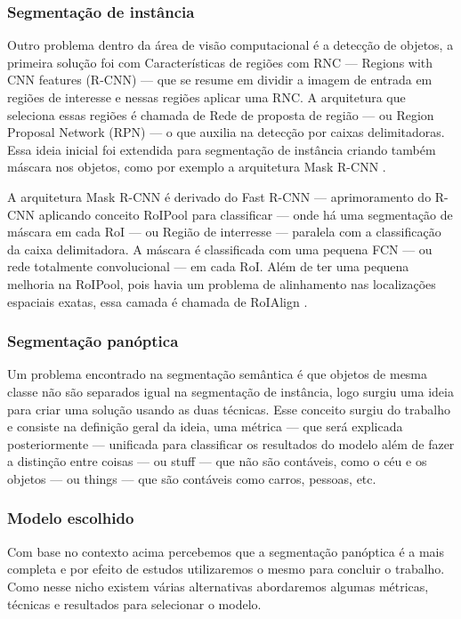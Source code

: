 \subsubsection*{Segmentação de instância}

Outro problema dentro da área de visão computacional é a detecção de objetos, a primeira solução foi com Características de regiões com RNC — Regions with CNN features (R-CNN) — que se resume em dividir a imagem de entrada em regiões de interesse e nessas regiões aplicar uma RNC. A arquitetura que seleciona essas regiões é chamada de Rede de proposta de região — ou Region Proposal Network (RPN) — o que auxilia na detecção por caixas delimitadoras. Essa ideia inicial foi extendida para segmentação de instância criando também máscara nos objetos, como por exemplo a arquitetura Mask R-CNN \cite{dp_semantic_segmantation, lapix}.

A arquitetura Mask R-CNN é derivado do Fast R-CNN — aprimoramento do R-CNN aplicando conceito RoIPool para classificar — onde há uma segmentação de máscara em cada RoI — ou Região de interresse — paralela com a classificação da caixa delimitadora. A máscara é classificada com uma pequena FCN — ou rede totalmente convolucional — em cada RoI. Além de ter uma pequena melhoria na RoIPool, pois havia um problema de alinhamento nas localizações espaciais exatas, essa camada é chamada de RoIAlign \cite{maskRCNN}.

\subsubsection*{Segmentação panóptica}

Um problema encontrado na segmentação semântica é que objetos de mesma classe não são separados igual na segmentação de instância, logo surgiu uma ideia para criar uma solução usando as duas técnicas. Esse conceito surgiu do trabalho  e consiste na definição geral da ideia, uma métrica — que será explicada posteriormente — unificada para classificar os resultados do modelo além de fazer a distinção entre coisas — ou stuff — que não são contáveis, como o céu e os objetos — ou things — que são contáveis como carros, pessoas, etc.

\subsubsection*{Modelo escolhido}

Com base no contexto acima percebemos que a segmentação panóptica é a mais completa e por efeito de estudos utilizaremos o mesmo para concluir o trabalho. Como nesse nicho existem várias alternativas abordaremos algumas métricas, técnicas e resultados para selecionar o modelo.

